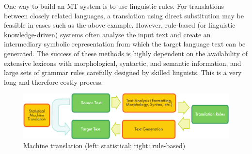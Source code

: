 \begin{multicols}{2}
One way to build an MT system is to use linguistic rules. For translations between closely related languages, a translation using direct substitution may be feasible in cases such as the above example. However, rule-based (or linguistic knowledge-driven) systems often analyse the input text and create an intermediary symbolic representation from which the target language text can be generated. The success of these methods is highly dependent on the availability of extensive lexicons with morphological, syntactic, and semantic information, and large sets of grammar rules carefully designed by skilled linguists. This is a very long and therefore costly process.

\begin{figure}[htb]
  \center
  \includegraphics[width=\textwidth]{../_media/english/machine_translation}
  \caption{Machine translation (left: statistical; right: rule-based)}
  \label{fig:mtarch_en}
\end{figure}


\end{multicols}
